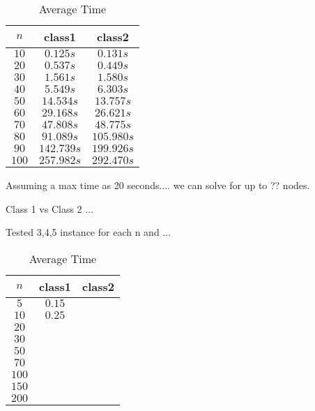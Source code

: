 \documentclass[a4paper, 11pt]{article}
\begin{document}
		
		\begin{table}[H]
			\centering
			\begin{tabular}{c|c|c}
				\textbf{$ n $} 	& \textbf{class1} 	& \textbf{class2}  \\ \hline
				$ 10  $			& $ 0.125 s $ 		& $ 0.131 s $ \\ \hline
				$ 20  $			& $ 0.537 s $ 		& $ 0.449 s $ \\ \hline
				$ 30  $			& $ 1.561 s $	 	& $ 1.580 s $ \\ \hline
				$ 40  $			& $ 5.549 s $ 		& $ 6.303 s $ \\ \hline
				$ 50  $			& $ 14.534 s $ 		& $ 13.757 s $ \\ \hline
				$ 60 $			& $ 29.168 s $ 		& $ 26.621 s $ \\ \hline
				$ 70 $			& $ 47.808 s $	 	& $ 48.775 s $ \\ \hline
				$ 80 $			& $ 91.089 s $ 		& $ 105.980 s $ \\ \hline
				$ 90 $			& $ 142.739 s $	 	& $ 199.926 s $ \\ \hline
				$ 100 $			& $ 257.982 s $ 		& $ 292.470 s $ \\ 
			\end{tabular}
			\caption{Average Time}
			\label{table:times}
		\end{table}
		
		Assuming a max time as 20 seconds.... we can solve for up to ?? nodes.
		
		Class 1 vs Class 2 $\ldots$
		
		Tested 3,4,5 instance for each n and $\ldots$
	\begin{table}[H]
		\centering
		\begin{tabular}{c|c|c}
			\textbf{$ n $} 	& \textbf{class1} & \textbf{class2}  \\ \hline
			$ 5  $			& $ 0.15 $ 			& $  $ \\ \hline
			$ 10  $			& $ 0.25 $ 			& $ $ \\ \hline
			$ 20  $			& $  $ 			& $  $ \\ \hline
			$ 30  $			& $  $	 		& $  $ \\ \hline
			$ 50  $			& $  $	 		& $  $ \\ \hline
			$ 70  $			& $  $	 		& $  $ \\ \hline
			$ 100 $			& $  $	 		& $  $ \\ \hline
			$ 150 $			& $  $	 		& $  $ \\ \hline
			$ 200 $			& $  $ 			& $  $ \\ 
		\end{tabular}
		\caption{Average Time}
		\label{table:times2}
	\end{table}
\end{document}
